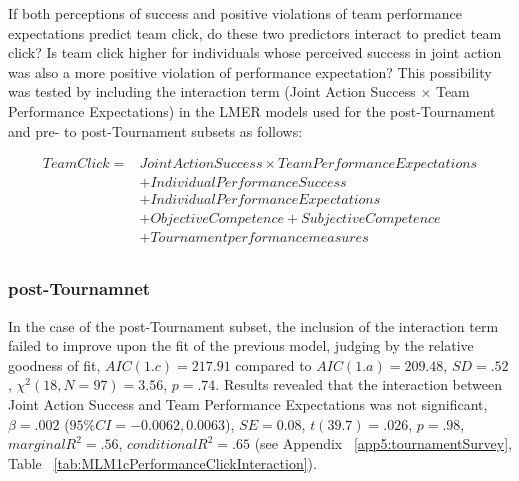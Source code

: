 If both perceptions of success and positive violations of team performance expectations predict team click, do these two predictors interact to predict team click?  Is team click higher for individuals whose perceived success in joint action was also a more positive violation of performance expectation?  This possibility was tested by including the interaction term (Joint Action Success $\times$ Team Performance Expectations) in the LMER models used for the post-Tournament and pre- to post-Tournament subsets as follows:


    \begin{align*}
      Team Click =  & Joint Action Success \times Team Performance Expectations \\
                &+ Individual Performance Success \\
                &+ Individual Performance Expectations \\
                &+ Objective Competence + Subjective Competence  \\
                &+ Tournament performance measures \\
    \end{align*}

  \bigskip

  \subsubsection{post-Tournamnet}
  In the case of the post-Tournament subset, the inclusion of the interaction term failed to improve upon the fit of the previous model, judging by the relative goodness of fit, $AIC(1.c) = 217.91$ compared to $AIC(1.a) = 209.48$, $SD = .52 $, $\chi^2(18, N = 97) = 3.56$, $ p =.74$.
  Results revealed that the interaction between Joint Action Success and Team Performance Expectations was not significant, $\beta = .002$ ($95\% CI =  -0.0062, 0.0063$), $SE = 0.08$, $t(39.7) = .026$, $p = .98$, $marginal R^2 = .56$, $conditional R^2 = .65$ (see Appendix ~\ref{app5:tournamentSurvey}, Table ~\ref{tab:MLM1cPerformanceClickInteraction}).




